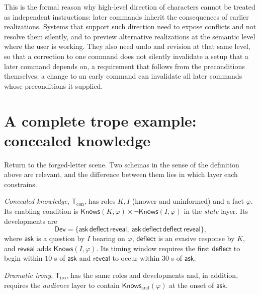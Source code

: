 This is the formal reason why high-level direction of characters cannot be treated as independent instructions: later commands inherit the consequences of earlier realizations. Systems that support such direction need to expose conflicts and not resolve them silently, and to preview alternative realizations at the semantic level where the user is working. They also need undo and revision at that same level, so that a correction to one command does not silently invalidate a setup that a later command depends on, a requirement that follows from the preconditions themselves: a change to an early command can invalidate all later commands whose preconditions it supplied.

\section{A complete trope example: concealed knowledge}\label{sec:tropeexample}

Return to the forged-letter scene. Two schemas in the sense of the definition above are relevant, and the difference between them lies in which layer each constrains.

\begin{definition}
\emph{Concealed knowledge}, $\mathsf{T}_{\mathrm{con}}$, has roles $K,I$ (knower and uninformed) and a fact $\varphi$. Its enabling condition is $\mathsf{Knows}(K,\varphi)\times\neg\mathsf{Knows}(I,\varphi)$ in the \emph{state} layer. Its developments are
\[
\mathsf{Dev}=\{\mathsf{ask}\,\mathsf{deflect}\,\mathsf{reveal},\ \mathsf{ask}\,\mathsf{deflect}\,\mathsf{deflect}\,\mathsf{reveal}\},
\]
where $\mathsf{ask}$ is a question by $I$ bearing on $\varphi$, $\mathsf{deflect}$ is an evasive response by $K$, and $\mathsf{reveal}$ adds $\mathsf{Knows}(I,\varphi)$. Its timing window requires the first $\mathsf{deflect}$ to begin within $10$ s of $\mathsf{ask}$ and $\mathsf{reveal}$ to occur within $30$ s of $\mathsf{ask}$.

\emph{Dramatic irony}, $\mathsf{T}_{\mathrm{iro}}$, has the same roles and developments and, in addition, requires the \emph{audience} layer to contain $\mathsf{Knows}_{\mathrm{aud}}(\varphi)$ at the onset of $\mathsf{ask}$.
\end{definition}

